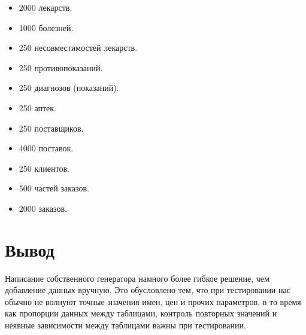 \documentclass[14pt,a4paper,report]{report}
\begin{document}
\begin{itemize}
	\item 2000 лекарств.
	\item 1000 болезней.
	\item 250 несовместимостей лекарств.
	\item 250 противопоказаний.
	\item 250 диагнозов (показаний).
	\item 250 аптек.
	\item 250 поставщиков.
	\item 4000 поставок.
	\item 250 клиентов.
	\item 500 частей заказов.
	\item 2000 заказов.
\end{itemize}	

\section{Вывод}

Написание собственного генератора намного более гибкое решение, чем добавление данных вручную. Это обусловлено тем, что при тестировании нас обычно не волнуют точные значения имен, цен и прочих параметров, в то время как пропорции данных между таблицами, контроль повторных значений и неявные зависимости между таблицами важны при тестировании.
\end{document}
